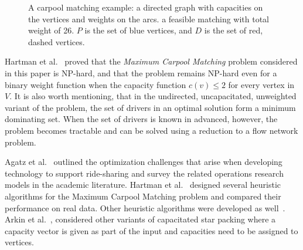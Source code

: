 \documentclass[draft]{article}
\def\CARPOOL{Maximum Carpool Ma\-tching}
\begin{document}
\begin{figure}
{}
\caption[]{
\label{fig:carpool}
A carpool matching example: 
a directed graph with capacities on the vertices and weights on the arcs. 
a feasible matching with total weight of 26.
$P$ is the set of blue vertices, and $D$ is the set of red, dashed vertices. 
}
\end{figure}  

Hartman et al.~\cite{hartman2013optimal} proved that the
\emph{\CARPOOL{}} problem considered in this paper is NP-hard,
and that the problem remains NP-hard even for a binary weight function when
the capacity function $c(v) \leq 2$ for every vertex in $V$.
It is also worth mentioning, that in the undirected, uncapacitated, unweighted
variant of the problem, the set of drivers in an optimal solution
form a minimum dominating set.
When the set of drivers is known in advanced, however, the problem becomes
tractable and can be solved using a reduction to a flow network problem.

Agatz et al.~\cite{agatz2012optimization} outlined the optimization challenges
that arise when developing technology to support ride-sharing and survey the
related operations research models in the academic literature.  
Hartman et al.~\cite{hartman2014theory} designed several heuristic algorithms
for the \CARPOOL{} problem and compared 
their performance on real data.
Other heuristic algorithms were developed as well~\cite{knapen2014exploiting}.
Arkin et al.~\cite{arkin2004approximations}, considered other variants of
capacitated star packing where a capacity vector is given as part of the input and 
capacities need to be assigned to vertices.  
\end{document}

